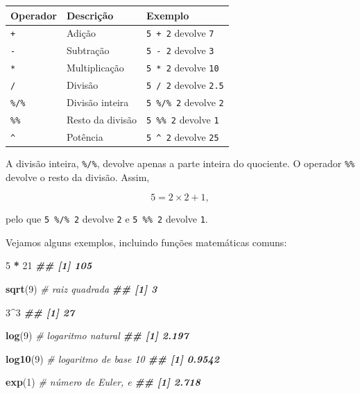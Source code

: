 \documentclass[
  portuguese,
  11pt,
  openany]{book}
\newenvironment{Shaded}{\begin{snugshade}}{\end{snugshade}}
\newcommand{\CommentTok}[1]{\textcolor[rgb]{0.56,0.35,0.01}{\textit{#1}}}
\newcommand{\DecValTok}[1]{\textcolor[rgb]{0.00,0.00,0.81}{#1}}
\newcommand{\DocumentationTok}[1]{\textcolor[rgb]{0.56,0.35,0.01}{\textbf{\textit{#1}}}}
\newcommand{\FunctionTok}[1]{\textcolor[rgb]{0.13,0.29,0.53}{\textbf{#1}}}
\newcommand{\NormalTok}[1]{#1}
\newcommand{\SpecialCharTok}[1]{\textcolor[rgb]{0.81,0.36,0.00}{\textbf{#1}}}
\newcounter{none} %
\begin{document}
{\def\LTcaptype{none} %
\begin{longtable}[]{@{}lll@{}}
\toprule\noalign{}
Operador & Descrição & Exemplo \\
\midrule\noalign{}
\endhead
\bottomrule\noalign{}
\endlastfoot
\texttt{+} & Adição & \texttt{5\ +\ 2} devolve \texttt{7} \\
\texttt{-} & Subtração & \texttt{5\ -\ 2} devolve \texttt{3} \\
\texttt{*} & Multiplicação & \texttt{5\ *\ 2} devolve \texttt{10} \\
\texttt{/} & Divisão & \texttt{5\ /\ 2} devolve \texttt{2.5} \\
\texttt{\%/\%} & Divisão inteira & \texttt{5\ \%/\%\ 2} devolve \texttt{2} \\
\texttt{\%\%} & Resto da divisão & \texttt{5\ \%\%\ 2} devolve \texttt{1} \\
\texttt{\^{}} & Potência & \texttt{5\ \^{}\ 2} devolve \texttt{25} \\
\end{longtable}
}

A divisão inteira, \texttt{\%/\%}, devolve apenas a parte inteira do quociente. O operador \texttt{\%\%} devolve o resto da divisão. Assim,

\[
5 = 2 \times 2 + 1,
\]

pelo que \texttt{5\ \%/\%\ 2} devolve \texttt{2} e \texttt{5\ \%\%\ 2} devolve \texttt{1}.

Vejamos alguns exemplos, incluindo funções matemáticas comuns:

\begin{Shaded}
\begin{Highlighting}[]
\DecValTok{5} \SpecialCharTok{*} \DecValTok{21}
\DocumentationTok{\#\# [1] 105}

\FunctionTok{sqrt}\NormalTok{(}\DecValTok{9}\NormalTok{)      }\CommentTok{\# raiz quadrada}
\DocumentationTok{\#\# [1] 3}

\DecValTok{3}\SpecialCharTok{\^{}}\DecValTok{3}
\DocumentationTok{\#\# [1] 27}

\FunctionTok{log}\NormalTok{(}\DecValTok{9}\NormalTok{)       }\CommentTok{\# logaritmo natural}
\DocumentationTok{\#\# [1] 2.197}

\FunctionTok{log10}\NormalTok{(}\DecValTok{9}\NormalTok{)     }\CommentTok{\# logaritmo de base 10}
\DocumentationTok{\#\# [1] 0.9542}

\FunctionTok{exp}\NormalTok{(}\DecValTok{1}\NormalTok{)       }\CommentTok{\# número de Euler, e}
\DocumentationTok{\#\# [1] 2.718}
\end{Highlighting}
\end{Shaded}
\end{document}
